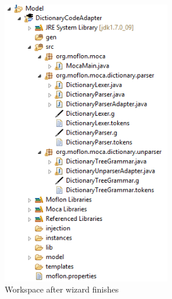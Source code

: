 \begin{figure}[!htbp]
\begin{center}
 \includegraphics[width=0.65\textwidth]{pics/moca/2TextToMocaTree/3-WizardResult}
  \caption{Workspace after wizard finishes}
  \label{fig:moca-3-WizardResult}
\end{center}
\end{figure}
